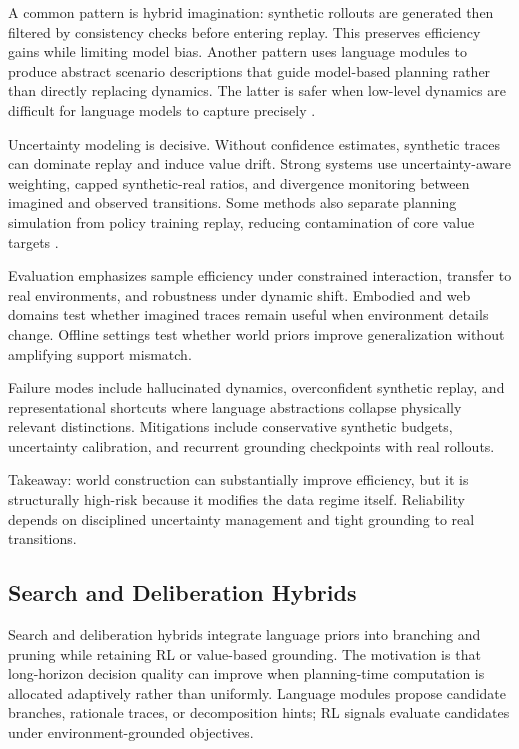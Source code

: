 \documentclass[pdflatex,sn-mathphys-num]{sn-jnl}
\begin{document}
A common pattern is hybrid imagination: synthetic rollouts are generated then filtered by consistency checks before entering replay. This preserves efficiency gains while limiting model bias. Another pattern uses language modules to produce abstract scenario descriptions that guide model-based planning rather than directly replacing dynamics. The latter is safer when low-level dynamics are difficult for language models to capture precisely \cite{arxiv_p_2301_12050,arxiv_p_2602_02454,arxiv_p_2602_00785,arxiv_p_2601_22149}.

Uncertainty modeling is decisive. Without confidence estimates, synthetic traces can dominate replay and induce value drift. Strong systems use uncertainty-aware weighting, capped synthetic-real ratios, and divergence monitoring between imagined and observed transitions. Some methods also separate planning simulation from policy training replay, reducing contamination of core value targets \cite{arxiv_p_2602_11075,arxiv_p_2602_13156,arxiv_p_2511_03181,arxiv_p_2406_14556}.

Evaluation emphasizes sample efficiency under constrained interaction, transfer to real environments, and robustness under dynamic shift. Embodied and web domains test whether imagined traces remain useful when environment details change. Offline settings test whether world priors improve generalization without amplifying support mismatch.

Failure modes include hallucinated dynamics, overconfident synthetic replay, and representational shortcuts where language abstractions collapse physically relevant distinctions. Mitigations include conservative synthetic budgets, uncertainty calibration, and recurrent grounding checkpoints with real rollouts.

Takeaway: world construction can substantially improve efficiency, but it is structurally high-risk because it modifies the data regime itself. Reliability depends on disciplined uncertainty management and tight grounding to real transitions.

\subsection{Search and Deliberation Hybrids}
Search and deliberation hybrids integrate language priors into branching and pruning while retaining RL or value-based grounding. The motivation is that long-horizon decision quality can improve when planning-time computation is allocated adaptively rather than uniformly. Language modules propose candidate branches, rationale traces, or decomposition hints; RL signals evaluate candidates under environment-grounded objectives.
\end{document}
